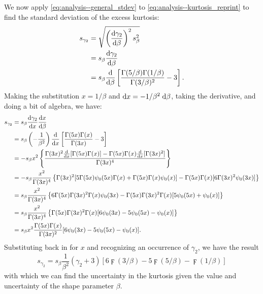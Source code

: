 We now apply \eqref{eq:analysis--general_stdev} to \eqref{eq:analysis--kurtosis_reprint} to find the standard deviation of the excess kurtosis:
\begin{align} \label{eq:analysis--kurt_err_partial1}
	s_{\gamma_{2}} &= \sqrt{ \left( \frac{{\rm {d}} \gamma_{2}}{{\rm {d}} \beta} \right)^{2} s_{\beta}^{2} } \\
		&= s_{\beta} \frac{{\rm {d}} \gamma_{2}}{{\rm {d}} \beta} \\
		&= s_{\beta} \frac{{\rm {d}}}{{\rm {d}} \beta} \left[ \frac{\Gamma(5/\beta) \Gamma(1/\beta)}{\Gamma(3/\beta)^{2}} - 3 \right].
\end{align}
Making the substitution $x = 1 / \beta$ and ${\rm {d}} x = - 1 / \beta^{2} {\; \rm {d}} \beta$, taking the derivative, and doing a bit of algebra, we have:
\begin{align} \label{eq:analysis--kurt_err_partial2}
	s_{\gamma_{2}} &= s_{\beta} \frac{{\rm {d}} \gamma_{2}}{{\rm {d}} x} \frac{{\rm {d}} x}{{\rm {d}} \beta} \\
		&= s_{\beta} \left( -\frac{1}{\beta^{2}} \right) \frac{{\rm {d}}}{{\rm {d}} x} \left[ \frac{\Gamma(5x) \Gamma(x)}{\Gamma(3x)} - 3 \right] \\
		&= -s_{\beta} x^{2} \left\{ \frac{\Gamma(3x)^{2} \frac{{\rm {d}}}{{\rm {d}} x} [\Gamma(5x) \Gamma(x)] - \Gamma(5x) \Gamma(x) \frac{{\rm {d}}}{{\rm {d}} x} [\Gamma(3x)^{2}]}{\Gamma(3x)^{4}} \right\} \\
		&= -s_{\beta} \frac{x^{2}}{\Gamma(3x)^{4}} \left\{ \Gamma(3x)^{2} [5\Gamma(5x) {\psi_{0}}(5x) \Gamma(x) + \Gamma(5x) \Gamma(x) {\psi_{0}}(x)] - \Gamma(5x) \Gamma(x) [6\Gamma(3x)^{2} {\psi_{0}}(3x)] \right\} \\
		&= s_{\beta} \frac{x^{2}}{\Gamma(3x)^{4}} \left\{ 6\Gamma(5x) \Gamma(3x)^{2} \Gamma(x) {\psi_{0}}(3x) - \Gamma(5x) \Gamma(3x)^{2} \Gamma(x) [5{\psi_{0}}(5x) + {\psi_{0}}(x)] \right\} \\
		&= s_{\beta} \frac{x^{2}}{\Gamma(3x)^{4}} \left\{ \Gamma(5x) \Gamma(3x)^{2} \Gamma(x) [6{\psi_{0}}(3x) - 5{\psi_{0}}(5x) - {\psi_{0}}(x)] \right\} \\
		&= s_{\beta} x^{2} \frac{\Gamma(5x) \Gamma(x)}{\Gamma(3x)^{2}} [6{\psi_{0}}(3x) - 5{\psi_{0}}(5x) - {\psi_{0}}(x)].
\end{align}
Substituting back in for $x$ and recognizing an occurrence of $\gamma_{2}$, we have the result
\begin{equation} \label{eq:analysis--kurt_err}
	s_{\gamma_{2}} = s_{\beta} \frac{1}{\beta^{2}} \left( \gamma_{2} + 3 \right) \left[ 6 \digamma(3/\beta) - 5 \digamma(5/\beta) - \digamma(1/\beta) \right]
\end{equation}
with which we can find the uncertainty in the kurtosis given the value and uncertainty of the shape parameter $\beta$.

